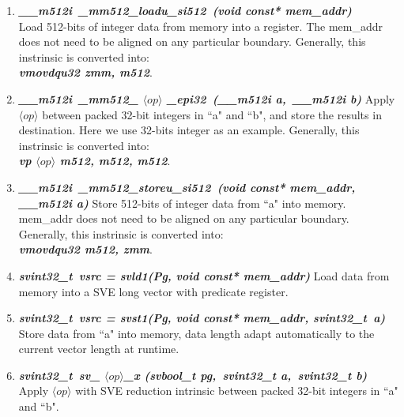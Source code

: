 \documentclass[5p,times,twocolumn]{elsarticle}
\begin{document}
\begin{enumerate}[]%
  \item \emph{\textbf{\textit{\_\_m512i\ \_mm512\_loadu\_si512\ (void const* mem\_addr)}}} \\
  Load 512-bits of integer data from memory into a register. The mem\_addr does not need to be aligned on any particular boundary.
  Generally, this instrinsic is converted into:\\
  \emph{\textbf{\textit{vmovdqu32  zmm,  m512}}}.
  \item \emph{\textbf{\textit{\_\_m512i\ \_mm512\_ $\langle op \rangle$ \_epi32\ (\_\_m512i a,\ \_\_m512i b)}}}
  Apply $\langle op \rangle$ between packed 32-bit integers in ``a" and ``b", and store the results in destination. Here we use 32-bits integer as an example.
  Generally, this instrinsic is converted into:\\
  \emph{\textbf{\textit{vp $\langle op \rangle$  m512,  m512,  m512}}}.
  \item \emph{\textbf{\textit{\_\_m512i\ \_mm512\_storeu\_si512\ (void const* mem\_addr,\\ \_\_m512i a)}}}
  Store 512-bits of integer data from ``a" into memory. mem\_addr does not need to be aligned on any particular boundary.
  Generally, this instrinsic is converted into:\\
  \emph{\textbf{\textit{vmovdqu32  m512, zmm}}}.
  \item \emph{\textbf{\textit{svint32\_t\ vsrc = svld1(Pg, void const* mem\_addr)}}}
  Load data from memory into a SVE long vector with predicate register.
  \item \emph{\textbf{\textit{svint32\_t\ vsrc = svst1(Pg, void const* mem\_addr, svint32\_t\ a)}}}
  Store data from ``a" into memory, data length adapt automatically to the current vector length at runtime.
  \item \emph{\textbf{\textit{svint32\_t\ sv_ $\langle op \rangle$\_x (svbool\_t pg,\ svint32\_t a,\ svint32\_t b)}}}
  Apply $\langle op \rangle$ with SVE reduction intrinsic between packed 32-bit integers in ``a" and ``b".
\end{enumerate}
\end{document}
